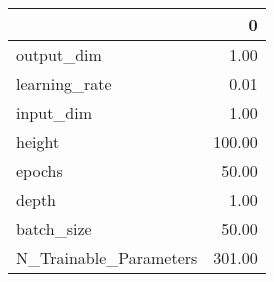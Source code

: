\begin{tabular}{lr}
\toprule
{} &       0 \\
\midrule
output\_dim             &    1.00 \\
learning\_rate          &    0.01 \\
input\_dim              &    1.00 \\
height                 &  100.00 \\
epochs                 &   50.00 \\
depth                  &    1.00 \\
batch\_size             &   50.00 \\
N\_Trainable\_Parameters &  301.00 \\
\bottomrule
\end{tabular}
